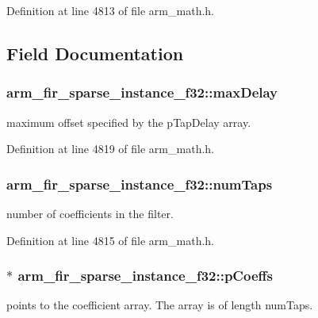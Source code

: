 Definition at line 4813 of file arm\-\_\-math.\-h.



\subsection{Field Documentation}
\hypertarget{structarm__fir__sparse__instance__f32_af8b8c775f4084c36774f06c082b4c078}{
\subsubsection[{max\-Delay}]{ arm\-\_\-fir\-\_\-sparse\-\_\-instance\-\_\-f32\-::max\-Delay}}\label{structarm__fir__sparse__instance__f32_af8b8c775f4084c36774f06c082b4c078}
maximum offset specified by the p\-Tap\-Delay array. 

Definition at line 4819 of file arm\-\_\-math.\-h.

\hypertarget{structarm__fir__sparse__instance__f32_a5e19e7f234ac30a3db843352bf2a8515}{
\subsubsection[{num\-Taps}]{ arm\-\_\-fir\-\_\-sparse\-\_\-instance\-\_\-f32\-::num\-Taps}}\label{structarm__fir__sparse__instance__f32_a5e19e7f234ac30a3db843352bf2a8515}
number of coefficients in the filter. 

Definition at line 4815 of file arm\-\_\-math.\-h.

\hypertarget{structarm__fir__sparse__instance__f32_a04af7c738dfb0882ad102fcad501d94a}{
\subsubsection[{p\-Coeffs}]{$\ast$ arm\-\_\-fir\-\_\-sparse\-\_\-instance\-\_\-f32\-::p\-Coeffs}}\label{structarm__fir__sparse__instance__f32_a04af7c738dfb0882ad102fcad501d94a}
points to the coefficient array. The array is of length num\-Taps. 

